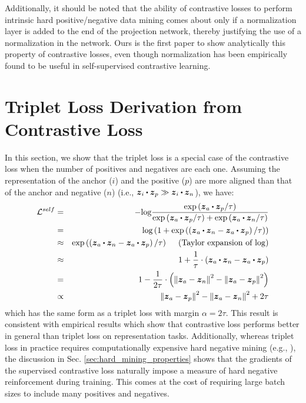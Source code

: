 Additionally, it should be noted that the ability of contrastive losses to perform intrinsic hard positive/negative data mining comes about only if a normalization layer is added to the end of the projection network, thereby justifying the use of a normalization in the network. Ours is the first paper to show analytically this property of contrastive losses, even though normalization has been empirically found to be useful in self-supervised contrastive learning.

\section{Triplet Loss Derivation from Contrastive Loss}
\label{sec:triplet_loss_derivation}

In this section, we show that the triplet loss \cite{weinberger2009distance} is a special case of the contrastive loss when the number of positives and negatives are each one. Assuming the representation of the anchor ($i$) and the positive ($p$) are more aligned than that of the anchor and negative ($n$) (i.e., $\boldsymbol{z}_i\bigcdot\boldsymbol{z}_p\gg\boldsymbol{z}_i\bigcdot\boldsymbol{z}_n$), we have:
\begin{eqnarray}
  \mathcal{L}^{self} & = & -\text{log}\frac{\text{exp}\left(\boldsymbol{z}_a\bigcdot\boldsymbol{z}_p/\tau\right)}{\text{exp}\left(\boldsymbol{z}_a\bigcdot\boldsymbol{z}_p/\tau\right)+\text{exp}\left(\boldsymbol{z}_a\bigcdot\boldsymbol{z}_n/\tau\right)} \nonumber \\
  & = & \text{log}\left(1+\text{exp}\left(\left(\boldsymbol{z}_a\bigcdot\boldsymbol{z}_n-\boldsymbol{z}_a\bigcdot\boldsymbol{z}_p\right)/\tau\right)\right) \nonumber \\
  & \approx & \text{exp}\left(\left(\boldsymbol{z}_a\bigcdot\boldsymbol{z}_n-\boldsymbol{z}_a\bigcdot\boldsymbol{z}_p\right)/\tau\right) ~~~~\text{(Taylor expansion of $\log$)} \nonumber \\
  & \approx & 1+\frac{1}{\tau}\cdot\left(\boldsymbol{z}_a\bigcdot\boldsymbol{z}_n-\boldsymbol{z}_a\bigcdot\boldsymbol{z}_p\right) \nonumber \\
  & = & 1-\frac{1}{2\tau}\cdot\left(\left\Vert\boldsymbol{z}_a-\boldsymbol{z}_n\right\Vert^2-\left\Vert\boldsymbol{z}_a-\boldsymbol{z}_p\right\Vert^2\right) \nonumber \\
  & \propto & \left\Vert\boldsymbol{z}_a-\boldsymbol{z}_p\right\Vert^2-\left\Vert\boldsymbol{z}_a-\boldsymbol{z}_n\right\Vert^2+2\tau \nonumber
\end{eqnarray}
which has the same form as a triplet loss with margin $\alpha=2\tau$. This result is consistent with empirical results \cite{chen2020simple} which show that contrastive loss performs better in general than triplet loss on representation tasks. Additionally, whereas triplet loss in practice requires computationally expensive hard negative mining (e.g., \cite{schroff2015facenet}), the discussion in Sec. \ref{sec:hard_mining_properties} shows that the gradients of the supervised contrastive loss naturally impose a measure of hard negative reinforcement during training. This comes at the cost of requiring large batch sizes to include many positives and negatives.




